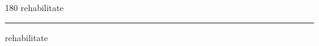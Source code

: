 
\begin{frame}
\begin{center}
\begin{turn}{180}
{\fontsize{2.5cm}{1em}\selectfont rehabilitate}
\end{turn}
\vspace{1em}\par  
\hrule
\vspace{1em}\par  
{\fontsize{2.5cm}{1em}\selectfont rehabilitate}
\end{center}
\end{frame}
